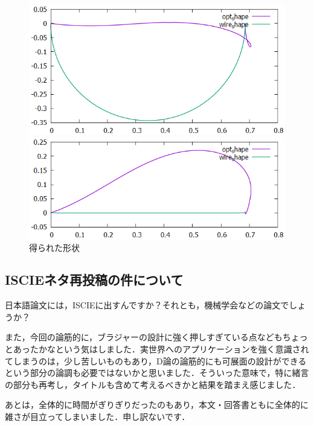\documentclass[11pt]{jsarticle}
\begin{document}
			\begin{figure}
				\begin{minipage}{0.5\hsize}
					\centering
					\includegraphics[width = \columnwidth]{./figure/AlignWire_xyview.png}
				\end{minipage}
				\begin{minipage}{0.5\hsize}
					\centering
					\includegraphics[width = \columnwidth]{./figure/AlignWire_xzview.png}
				\end{minipage}
			\caption{得られた形状}
			\end{figure}
		
		\subsection{ISCIEネタ再投稿の件について}
			日本語論文には，ISCIEに出すんですか？それとも，機械学会などの論文でしょうか？
			
			また，今回の論筋的に，ブラジャーの設計に強く押しすぎている点などもちょっとあったかなという気はしました．実世界へのアプリケーションを強く意識されてしまうのは，少し苦しいものもあり，D論の論筋的にも可展面の設計ができるという部分の論調も必要ではないかと思いました．そういった意味で，特に緒言の部分も再考し，タイトルも含めて考えるべきかと結果を踏まえ感じました．
			
			あとは，全体的に時間がぎりぎりだったのもあり，本文・回答書ともに全体的に雑さが目立ってしまいました．申し訳ないです．
			
\end{document}
